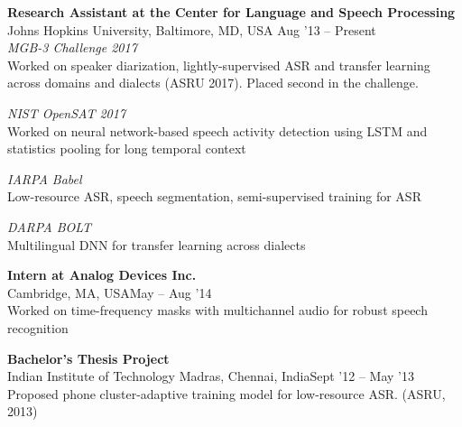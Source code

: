 \documentclass[margin,line,pifont,palatino,courier]{res}
\begin{document}
\begin{resume}
\textbf{Research Assistant at the Center for Language and Speech Processing} \\
Johns Hopkins University, Baltimore, MD, USA \hfill Aug '13 -- Present \vspace{2pt} \\
\textit{MGB-3 Challenge 2017} \\
Worked on speaker diarization, lightly-supervised ASR and transfer learning across domains and dialects (ASRU 2017). Placed second in the challenge.

\textit{NIST OpenSAT 2017} \\
Worked on neural network-based speech activity detection using LSTM and statistics pooling for long temporal context

\textit{IARPA Babel} \\
Low-resource ASR, speech segmentation, semi-supervised training for ASR

\textit{DARPA BOLT}\\
Multilingual DNN for transfer learning across dialects

\textbf{Intern at Analog Devices Inc.} \\
Cambridge, MA, USA\hfill May -- Aug '14 \vspace{2pt} \\
Worked on time-frequency masks with multichannel audio for robust speech recognition
\vspace{-5pt}

\textbf{Bachelor's Thesis Project} \\
Indian Institute of Technology Madras, Chennai, India\hfill Sept '12 -- May '13 \vspace{2pt}  \\
Proposed phone cluster-adaptive training model for low-resource ASR. (ASRU, 2013)



\end{resume}
\end{document}
